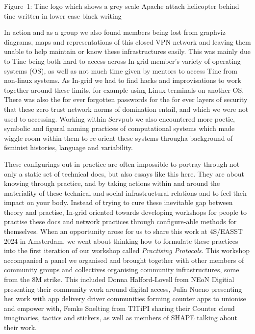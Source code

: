 Figure~1: Tinc logo which shows a grey scale Apache attach helicopter
behind tinc written in lower case black writing

In action and as a group we also found members being lost from graphviz
diagrams, maps and representations of this closed VPN network and
leaving them unable to help maintain or know these infrastructures
easily. This was mainly due to Tinc being both hard to access across
In-grid member's variety of operating systems (OS), as well as not much
time given by mentors to access Tinc from non-linux systems. As In-grid
we had to find hacks and improvisations to work together around these
limits, for example using Linux terminals on another OS. There was also
the for ever forgotten passwords for the for ever layers of security
that these zero trust network norms of domination entail, and which we
were not used to accessing. Working within Servpub we also encountered
more poetic, symbolic and figural naming practices of computational
systems which made wiggle room within them to re-orient these systems
througha background of feminist histories, language and variability.

These configurings out in practice are often impossible to portray
through not only a static set of technical docs, but also essays like
this here. They are about knowing through practice, and by taking
actions within and around the materiality of these technical and social
infrastructural relations and to feel their impact on your body. Instead
of trying to cure these inevitable gap between theory and practise,
In-grid oriented towards developing workshops for people to practise
these docs and network practices through configure-able methods for
themselves. When an opportunity arose for us to share this work at
4S/EASST 2024 in Amsterdam, we went about thinking how to formulate
these practices into the first iteration of our workshop called
\emph{Practising Protocols}. This workshop accompanied a panel we
organised and brought together with other members of community groups
and collectives organising community infrastructures, some from the 8M
strike. This included Donna Halford-Lovell from NEoN Digitial presenting
their community work around digital access, Julia Nueno presenting her
work with app delivery driver communities forming counter apps to
unionise and empower with, Femke Snelting from TITiPI sharing their
Counter cloud imaginaries, tactics and stickers, as well as members of
SHAPE talking about their work.

